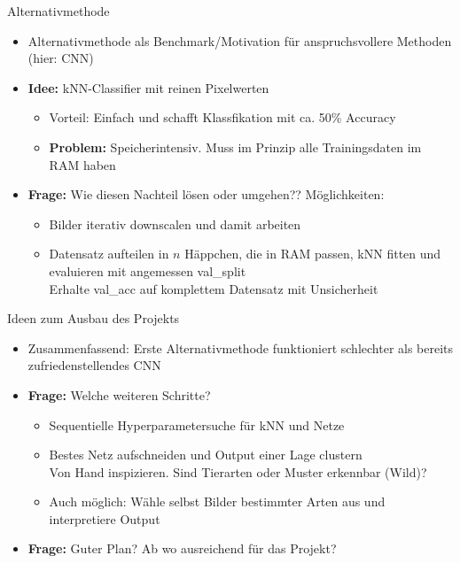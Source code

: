 \documentclass[aspectratio=1610, 9pt]{beamer}
\begin{document}
\begin{frame}{Alternativmethode}

  \begin{itemize}
    \item Alternativmethode als Benchmark/Motivation für anspruchsvollere Methoden (hier: CNN)
    \item \textbf{Idee:} kNN-Classifier mit reinen Pixelwerten
    \begin{itemize}
      \item Vorteil: Einfach und schafft Klassfikation mit ca. 50\% Accuracy
      \item \textbf{Problem:} Speicherintensiv. Muss im Prinzip alle Trainingsdaten im RAM haben
    \end{itemize}
    \item \textbf{Frage:} Wie diesen Nachteil lösen oder umgehen?? Möglichkeiten:
    \begin{itemize}
      \item Bilder iterativ downscalen und damit arbeiten
      \item Datensatz aufteilen in $n$ Häppchen, die in RAM passen, kNN fitten und evaluieren mit angemessen val\_split\\
      \rightarrow{} Erhalte val\_acc auf komplettem Datensatz mit Unsicherheit
    \end{itemize}
  \end{itemize}

\end{frame}


\begin{frame}{Ideen zum Ausbau des Projekts}

  \begin{itemize}
    \item Zusammenfassend: Erste Alternativmethode funktioniert schlechter als bereits zufriedenstellendes CNN
    \item \textbf{Frage:} Welche weiteren Schritte?
    \begin{itemize}
      \item Sequentielle Hyperparametersuche für kNN und Netze
      \item Bestes Netz aufschneiden und Output einer Lage clustern\\
      \rightarrow{} Von Hand inspizieren. Sind Tierarten oder Muster erkennbar (Wild)?
      \item Auch möglich: Wähle selbst Bilder bestimmter Arten aus und interpretiere Output
    \end{itemize}
    \item \textbf{Frage:} Guter Plan? Ab wo ausreichend für das Projekt?
  \end{itemize}

\end{frame}
\end{document}
